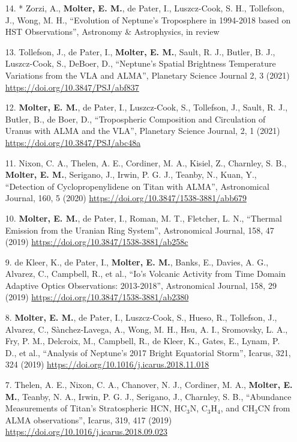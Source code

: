 \documentclass[margin, 10pt]{res} %
\begin{document}
\begin{resume}
{\begin{enumerate}
\item[14.]* Zorzi, A., {\bf Molter, E. M.}, de Pater, I., Luszcz-Cook, S. H., Tollefson, J., Wong, M. H., ``Evolution of Neptune's Troposphere in 1994-2018 based on HST Observations'', Astronomy \& Astrophysics, in review 

\item[13.] Tollefson, J., de Pater, I., {\bf Molter, E. M.}, Sault, R. J., Butler, B. J., Luszcz-Cook, S., DeBoer, D., ``Neptune's Spatial Brightness Temperature Variations from the VLA and ALMA'', Planetary Science Journal 2, 3 (2021) \url{https://doi.org/10.3847/PSJ/abf837}

\item[12.] {\bf Molter, E. M.}, de Pater, I., Luszcz-Cook, S., Tollefson, J., Sault, R. J., Butler, B., de Boer, D., ``Tropospheric Composition and Circulation of Uranus with ALMA and the VLA'', Planetary Science Journal, 2, 1 (2021) \url{https://doi.org/10.3847/PSJ/abc48a}

\item[11.] Nixon, C. A., Thelen, A. E., Cordiner, M. A., Kisiel, Z., Charnley, S. B., {\bf Molter, E. M.}, Serigano, J., Irwin, P. G. J., Teanby, N., Kuan, Y., ``Detection of Cyclopropenylidene on Titan with ALMA'', Astronomical Journal, 160, 5 (2020) \url{https://doi.org/10.3847/1538-3881/abb679}

\item[10.] {\bf Molter, E. M.}, de Pater, I., Roman, M. T., Fletcher, L. N., ``Thermal Emission from the Uranian Ring System'', Astronomical Journal, 158, 47 (2019) \url{https://doi.org/10.3847/1538-3881/ab258c}

\item[9.] de Kleer, K., de Pater, I., {\bf Molter, E. M.}, Banks, E., Davies, A. G., Alvarez, C., Campbell, R., et al., ``Io's Volcanic Activity from Time Domain Adaptive Optics Observations: 2013-2018'', Astronomical Journal, 158, 29 (2019) \url{https://doi.org/10.3847/1538-3881/ab2380}

\item[8.] {\bf Molter, E. M.}, de Pater, I., Luszcz-Cook, S., Hueso, R., Tollefson, J., Alvarez, C., S\`anchez-Lavega, A., Wong, M. H., Hsu, A. I., Sromovsky, L. A., Fry, P. M., Delcroix, M., Campbell, R., de Kleer, K., Gates, E., Lynam, P. D., et al., ``Analysis of Neptune's 2017 Bright Equatorial Storm'', Icarus, 321, 324 (2019) \url{https://doi.org/10.1016/j.icarus.2018.11.018}

\item[7.] Thelen, A. E., Nixon, C. A., Chanover, N. J., Cordiner, M. A., {\bf Molter, E. M.}, Teanby, N. A., Irwin, P. G. J., Serigano, J., Charnley, S. B., ``Abundance Measurements of Titan's Stratospheric HCN, HC$_3$N, C$_3$H$_4$, and CH$_3$CN from ALMA observations'', Icarus, 319, 417 (2019) \url{https://doi.org/10.1016/j.icarus.2018.09.023}


\end{enumerate}}
\end{resume}
\end{document}
